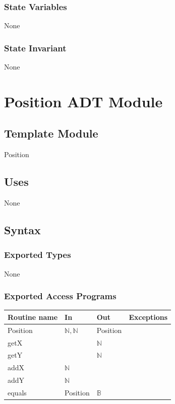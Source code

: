 \documentclass[12pt]{article}
\begin{document}
\subsubsection* {State Variables}

None

\subsubsection* {State Invariant}

None

\newpage

\section* {Position ADT Module}

\subsection* {Template Module}

Position

\subsection* {Uses}

None

\subsection* {Syntax}

\subsubsection* {Exported Types}

None

\subsubsection* {Exported Access Programs}

\begin{tabular}{| l | l | l | l |}
\hline
\textbf{Routine name} & \textbf{In} & \textbf{Out} & \textbf{Exceptions}\\
\hline
Position & $\mathbb{N}, \mathbb{N}$ & Position & ~ \\
\hline
getX & ~ & $\mathbb{N}$ & \\
\hline
getY & ~ & $\mathbb{N}$ & \\
\hline
addX & $\mathbb{N}$ & ~ & ~ \\
\hline
addY & $\mathbb{N}$ & ~ & ~ \\
\hline
equals & Position & $\mathbb{B}$ & ~\\
\hline
\end{tabular}
\end{document}
